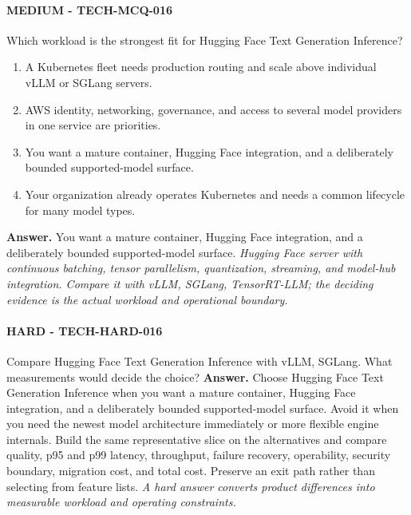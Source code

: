 \paragraph{MEDIUM - TECH-MCQ-016} Which workload is the strongest fit for Hugging Face Text Generation Inference?
\begin{enumerate}[label=\Alph*.]
\item A Kubernetes fleet needs production routing and scale above individual vLLM or SGLang servers.
\item AWS identity, networking, governance, and access to several model providers in one service are priorities.
\item You want a mature container, Hugging Face integration, and a deliberately bounded supported-model surface.
\item Your organization already operates Kubernetes and needs a common lifecycle for many model types.
\end{enumerate}
\textbf{Answer.} You want a mature container, Hugging Face integration, and a deliberately bounded supported-model surface.
\textit{Hugging Face server with continuous batching, tensor parallelism, quantization, streaming, and model-hub integration. Compare it with vLLM, SGLang, TensorRT-LLM; the deciding evidence is the actual workload and operational boundary.}
\paragraph{HARD - TECH-HARD-016} Compare Hugging Face Text Generation Inference with vLLM, SGLang. What measurements would decide the choice?
\textbf{Answer.} Choose Hugging Face Text Generation Inference when you want a mature container, Hugging Face integration, and a deliberately bounded supported-model surface. Avoid it when you need the newest model architecture immediately or more flexible engine internals. Build the same representative slice on the alternatives and compare quality, p95 and p99 latency, throughput, failure recovery, operability, security boundary, migration cost, and total cost. Preserve an exit path rather than selecting from feature lists.
\textit{A hard answer converts product differences into measurable workload and operating constraints.}
